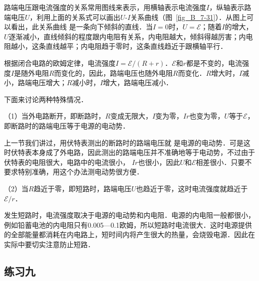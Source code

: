 路端电压跟电流强度的关系常用图线来表示，用横轴表示电流强度$I$，纵轴表示路端电压$U$，利用上面的关系式可以画出$U$-$I$关系曲线（图~\ref{fig_B_7-31}）．从图上可以看出，此关系曲线
是一条向下倾斜的直线．当$I=0$时，$U=\mathcal{E}$；随着$I$的增大，$U$逐渐减小，直线倾斜的程度跟内电阻有关系，内电阻越大，倾斜得越厉害；内电阻越小，这条直线越平；内电阻趋于零时，这条直线趋近于跟横轴平行．


根据闭合电路的欧姆定律，电流强度$I=\mathcal{E}/(R+r)$．$\mathcal{E}$和$r$都是不变的，电流强度$I$是随外电阻$R$而变化的，因此，路端电压也随外电阻$R$而变化．$R$增大时，$I$减小，路端电压增大；$R$减小时，$I$增大，路端电压减小．

下面来讨论两种特殊情况．

（1）当外电路断开，即断路时，$R$变成无限大，$I$变为零，$Ir$也变为零，$U$等于$\mathcal{E}$，即断路时的路端电压等于电源的电动势．

上一节我们讲过，用伏特表测出的断路时的路端电压就
是电源的电动势．可是这时伏特表本身成了外电路，因此测出的路端电压并不准确地等于电动势，不过由于伏特表的电阻很大，电路中的电流很小，
$Ir$也很小，因此$U$和$\mathcal{E}$相差很小．只要不要求特别准确，用这个办法测电动势很方便．

（2）当$R$趋近于零，即短路时，路端电压$U$也趋近于零，这时电流强度就趋近于$\mathcal{E}/r$．

发生短路时，电流强度取决于电源的电动势和内电阻．电源的内电阻一般都很小，例如铅蓄电池的内电阻只有0.005—0.1欧姆，所以短路时电流很大．这时电源提供的全部能量都消耗在内电路上，短时间内将产生很大的热量，会烧毁电源．因此在实际中要切实注意防止短路．

\subsection*{练习九}


